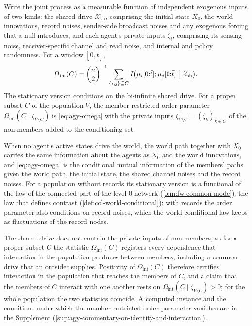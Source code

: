 \begin{definition}\label{def:agy-order-parameter}
Write the joint process as a measurable function of independent exogenous inputs of two kinds: the shared drive $\mathcal X_{\mathrm{sh}}$, comprising the initial state $X_0$, the world innovations, record noises, sender-side broadcast noises and any exogenous forcing that a null introduces, and each agent's private inputs $\zeta_i$, comprising its sensing noise, receiver-specific channel and read noise, and internal and policy randomness. For a window $[0,\bar t]$,
\begin{equation}\label{eq:agy-omega}
\Omega_{\mathrm{int}}(C)=\binom{n}{2}^{-1}\sum_{\{i,j\}\subseteq C}I\bigl(\mu_i[0{:}\bar t];\mu_j[0{:}\bar t]\bigm|\mathcal X_{\mathrm{sh}}\bigr).
\end{equation}
The stationary version conditions on the bi-infinite shared drive. For a proper subset $C$ of the population $V$, the member-restricted order parameter $\Omega_{\mathrm{int}}(C\mid\zeta_{V\setminus C})$ is \eqref{eq:agy-omega} with the private inputs $\zeta_{V\setminus C}=(\zeta_k)_{k\notin C}$ of the non-members added to the conditioning set.
\end{definition}

When no agent's active states drive the world, the world path together with $X_0$ carries the same information about the agents as $X_0$ and the world innovations, and \eqref{eq:agy-omega} is the conditional mutual information of the members' paths given the world path, the initial state, the shared channel noises and the record noises. For a population without records its stationary version is a functional of the law of the connected part of the level-0 network (\cref{lem:fw-common-mode}), the law that defines contrast (\cref{def:col-world-conditional}); with records the order parameter also conditions on record noises, which the world-conditional law keeps as fluctuations of the record nodes.

The shared drive does not contain the private inputs of non-members, so for a proper subset $C$ the statistic $\Omega_{\mathrm{int}}(C)$ registers every dependence that interaction in the population produces between members, including a common drive that an outsider supplies. Positivity of $\Omega_{\mathrm{int}}(C)$ therefore certifies interaction in the population that reaches the members of $C$, and a claim that the members of $C$ interact with one another rests on $\Omega_{\mathrm{int}}(C\mid\zeta_{V\setminus C})>0$; for the whole population the two statistics coincide. A computed instance and the conditions under which the member-restricted order parameter vanishes are in the Supplement (\cref{sup:agy-commentary-on-identity-and-interaction}).

